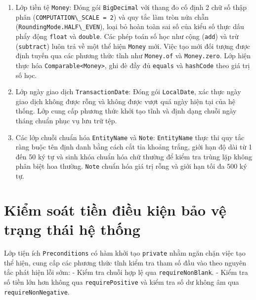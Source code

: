 \documentclass[a4paper,12pt]{report}
\providecommand{\tightlist}{%
  \setlength{\itemsep}{0pt}\setlength{\parskip}{0pt}}
\newcommand{\passthrough}[1]{#1}
\begin{document}
\begin{enumerate}
\def\labelenumi{\arabic{enumi}.}
\tightlist
\item
  Lớp tiền tệ \passthrough{\lstinline!Money!}: Đóng gói
  \passthrough{\lstinline!BigDecimal!} với thang đo cố định 2 chữ số
  thập phân (\passthrough{\lstinline!COMPUTATION\_SCALE = 2!}) và quy
  tắc làm tròn nửa chẵn
  (\passthrough{\lstinline!RoundingMode.HALF\_EVEN!}), loại bỏ hoàn toàn
  sai số của kiểu số thực dấu phẩy động \passthrough{\lstinline!float!}
  và \passthrough{\lstinline!double!}. Các phép toán số học như cộng
  (\passthrough{\lstinline!add!}) và trừ
  (\passthrough{\lstinline!subtract!}) luôn trả về một thể hiện
  \passthrough{\lstinline!Money!} mới. Việc tạo mới đối tượng được định
  tuyến qua các phương thức tĩnh như \passthrough{\lstinline!Money.of!}
  và \passthrough{\lstinline!Money.zero!}. Lớp hiện thực hóa
  \passthrough{\lstinline!Comparable<Money>!}, ghi đè đầy đủ
  \passthrough{\lstinline!equals!} và \passthrough{\lstinline!hashCode!}
  theo giá trị số học.
\item
  Lớp ngày giao dịch \passthrough{\lstinline!TransactionDate!}: Đóng gói
  \passthrough{\lstinline!LocalDate!}, xác thực ngày giao dịch không
  được rỗng và không được vượt quá ngày hiện tại của hệ thống. Lớp cung
  cấp phương thức khởi tạo tĩnh và định dạng chuỗi ngày tháng chuẩn phục
  vụ lưu trữ tệp.
\item
  Các lớp chuỗi chuẩn hóa \passthrough{\lstinline!EntityName!} và
  \passthrough{\lstinline!Note!}: \passthrough{\lstinline!EntityName!}
  thực thi quy tắc ràng buộc tên định danh bằng cách cắt tỉa khoảng
  trắng, giới hạn độ dài từ 1 đến 50 ký tự và sinh khóa chuẩn hóa chữ
  thường để kiểm tra trùng lặp không phân biệt hoa thường.
  \passthrough{\lstinline!Note!} chuẩn hóa giá trị rỗng và giới hạn tối
  đa 500 ký tự.
\end{enumerate}

\section{Kiểm soát tiền điều kiện bảo vệ trạng thái hệ
thống}\label{kiux1ec3m-souxe1t-tiux1ec1n-ux111iux1ec1u-kiux1ec7n-bux1ea3o-vux1ec7-trux1ea1ng-thuxe1i-hux1ec7-thux1ed1ng}

Lớp tiện ích \passthrough{\lstinline!Preconditions!} có hàm khởi tạo
\passthrough{\lstinline!private!} nhằm ngăn chặn việc tạo thể hiện, cung
cấp các phương thức tĩnh kiểm tra tham số đầu vào theo nguyên tắc phát
hiện lỗi sớm: - Kiểm tra chuỗi hợp lệ qua
\passthrough{\lstinline!requireNonBlank!}. - Kiểm tra số tiền lớn hơn
không qua \passthrough{\lstinline!requirePositive!} và kiểm tra số dư
không âm qua \passthrough{\lstinline!requireNonNegative!}.
\end{document}

